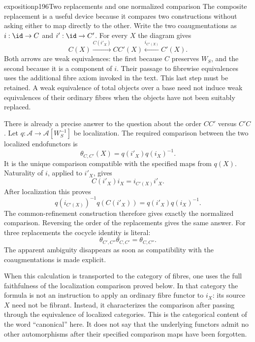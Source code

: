 \begin{dcomment}{exposition}{p196}{Two replacements and one normalized comparison}
The composite replacement is a useful device because it compares two constructions without asking either to map directly to the other. Write the two coaugmentations as $i:\id\to C$ and $i':\id\to C'$. For every $X$ the diagram gives
\[
 C(X)\xrightarrow{C(i'_X)}CC'(X)
       \xleftarrow{i_{C'(X)}}C'(X).
\]
Both arrows are weak equivalences: the first because $C$ preserves $W_S$, and the second because it is a component of $i$. Their passage to fibrewise equivalences uses the additional fibre axiom invoked in the text. This last step must be retained. A weak equivalence of total objects over a base need not induce weak equivalences of their ordinary fibres when the objects have not been suitably replaced.

There is already a precise answer to the question about the order $CC'$ versus $C'C$. Let $q:\mathcal A\to\mathcal A[W_S^{-1}]$ be localization. The required comparison between the two localized endofunctors is
\[
 \theta_{C,C'}(X)=q(i'_X)q(i_X)^{-1}.
\]
It is the unique comparison compatible with the specified maps from $q(X)$. Naturality of $i$, applied to $i'_X$, gives
\[
 C(i'_X)i_X=i_{C'(X)}i'_X.
\]
After localization this proves
\[
 q(i_{C'(X)})^{-1}q(C(i'_X))
       =q(i'_X)q(i_X)^{-1}.
\]
The common-refinement construction therefore gives exactly the normalized comparison. Reversing the order of the replacements gives the same answer. For three replacements the cocycle identity is literal:
\[
 \theta_{C',C''}\theta_{C,C'}=\theta_{C,C''}.
\]
The apparent ambiguity disappears as soon as compatibility with the coaugmentations is made explicit.

When this calculation is transported to the category of fibres, one uses the full faithfulness of the localization comparison proved below. In that category the formula is not an instruction to apply an ordinary fibre functor to $i_X$: its source $X$ need not be fibrant. Instead, it characterizes the comparison after passing through the equivalence of localized categories. This is the categorical content of the word ``canonical'' here. It does not say that the underlying functors admit no other automorphisms after their specified comparison maps have been forgotten.
\end{dcomment}

